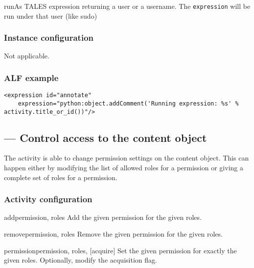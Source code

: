     \begin{memberdesc}{runAs}
        TALES expression returning a user or a username. The
        \texttt{expression} will be run under that user (like sudo)
    \end{memberdesc}

  \subsubsection{Instance configuration}

  Not applicable.

  \subsubsection{ALF example}

\begin{verbatim}
<expression id="annotate" 
    expression="python:object.addComment('Running expression: %s' % activity.title_or_id())"/>
\end{verbatim}
 
\subsection{ --- Control access to the content object}

 
The  activity is able to change permission settings on the
content object. This can happen either by modifying the list of allowed roles
for a permission or giving a complete set of roles for a permission.
  
\subsubsection{Activity configuration}

\begin{funcdesc}{add}{permission, roles}
    Add the given permission for the given roles.
\end{funcdesc}

\begin{funcdesc}{remove}{permission, roles}
    Remove the given permission for the given roles.
\end{funcdesc}

\begin{funcdesc}{permission}{permission, roles, [acquire]}
    Set the given permission for exactly the given roles. Optionally, modify the 
    acquisition flag.
\end{funcdesc}

